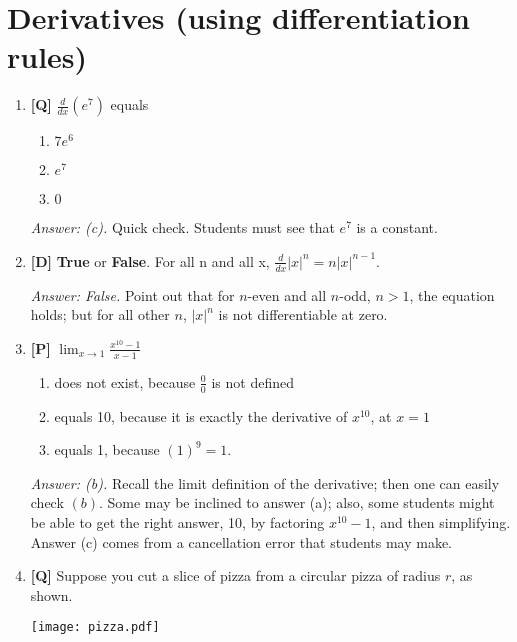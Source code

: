 \documentclass[12pt]{article}
\begin{document}
\section{Derivatives (using differentiation rules)}
\begin{enumerate}

\item {\bf [Q]} $\frac{d}{dx}(e^7)$ equals
\begin{enumerate}
\item $7e^6$
\item $e^7$
\item $0$
\end{enumerate}

{\it Answer: (c).} Quick check. Students must see that $e^7$ is a constant.

\bigskip

\item {\bf [D]} \textbf{True} or \textbf{False}. For all n and all x, $\frac{d}{dx}|x|^n=n|x|^{n-1}$.

{\it Answer: False.} Point out that for $n$-even and all $n$-odd, $n>1$, the equation holds; but for all other $n$, $|x|^n$ is not differentiable at zero.

\bigskip

\item {\bf [P]} $\displaystyle{\lim_{x\rightarrow 1}  \frac{x^{10}-1}{x-1}}$
\begin{enumerate}
\item does not exist, because $\frac{0}{0}$ is not defined
\item equals 10, because it is exactly the derivative of $x^{10}$, at $x=1$
\item equals 1, because $(1)^9=1$.
\end{enumerate}

{\it Answer: (b).} Recall the limit definition of the derivative; 
then one can easily check $(b)$. Some may be inclined to answer (a); 
also, some students might be able to get the right answer, 10, by 
factoring $x^{10}-1$, and then simplifying.  Answer (c) comes from
a cancellation error that students may make.

\bigskip

\item {\bf [Q]} Suppose you cut a slice of pizza from a 
circular pizza of radius $r$, as shown. 

\begin{center}
%
\texttt{[image: pizza.pdf]}
\end{center}


\end{enumerate}
\end{document}
